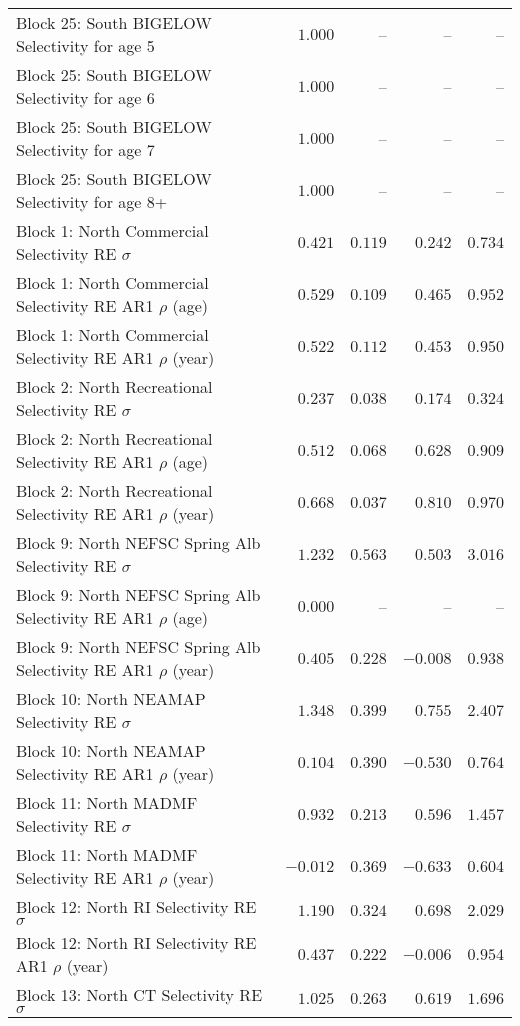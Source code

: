 \documentclass[
]{article}
\begin{document}
\begin{landscape}
\begin{longtable}[t]{lrrrr}
Block 25: South BIGELOW Selectivity for age 5 & $1.000$ & -- & -- & --\\
\addlinespace
Block 25: South BIGELOW Selectivity for age 6 & $1.000$ & -- & -- & --\\
Block 25: South BIGELOW Selectivity for age 7 & $1.000$ & -- & -- & --\\
Block 25: South BIGELOW Selectivity for age 8+ & $1.000$ & -- & -- & --\\
Block 1: North Commercial Selectivity RE $\sigma$ & $0.421$ & $0.119$ & $0.242$ & $0.734$\\
Block 1: North Commercial Selectivity RE AR1 $\rho$ (age) & $0.529$ & $0.109$ & $0.465$ & $0.952$\\
\addlinespace
Block 1: North Commercial Selectivity RE AR1 $\rho$ (year) & $0.522$ & $0.112$ & $0.453$ & $0.950$\\
Block 2: North Recreational Selectivity RE $\sigma$ & $0.237$ & $0.038$ & $0.174$ & $0.324$\\
Block 2: North Recreational Selectivity RE AR1 $\rho$ (age) & $0.512$ & $0.068$ & $0.628$ & $0.909$\\
Block 2: North Recreational Selectivity RE AR1 $\rho$ (year) & $0.668$ & $0.037$ & $0.810$ & $0.970$\\
Block 9: North NEFSC Spring Alb Selectivity RE $\sigma$ & $1.232$ & $0.563$ & $0.503$ & $3.016$\\
\addlinespace
Block 9: North NEFSC Spring Alb Selectivity RE AR1 $\rho$ (age) & $0.000$ & -- & -- & --\\
Block 9: North NEFSC Spring Alb Selectivity RE AR1 $\rho$ (year) & $0.405$ & $0.228$ & $-0.008$ & $0.938$\\
Block 10: North NEAMAP Selectivity RE $\sigma$ & $1.348$ & $0.399$ & $0.755$ & $2.407$\\
Block 10: North NEAMAP Selectivity RE AR1 $\rho$ (year) & $0.104$ & $0.390$ & $-0.530$ & $0.764$\\
Block 11: North MADMF Selectivity RE $\sigma$ & $0.932$ & $0.213$ & $0.596$ & $1.457$\\
\addlinespace
Block 11: North MADMF Selectivity RE AR1 $\rho$ (year) & $-0.012$ & $0.369$ & $-0.633$ & $0.604$\\
Block 12: North RI Selectivity RE $\sigma$ & $1.190$ & $0.324$ & $0.698$ & $2.029$\\
Block 12: North RI Selectivity RE AR1 $\rho$ (year) & $0.437$ & $0.222$ & $-0.006$ & $0.954$\\
Block 13: North CT Selectivity RE $\sigma$ & $1.025$ & $0.263$ & $0.619$ & $1.696$\\

\end{longtable}
\end{landscape}
\end{document}
